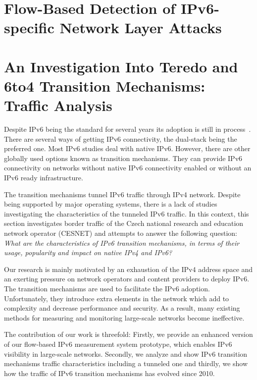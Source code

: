 \section{Flow-Based Detection of IPv6-specific Network Layer Attacks}\label{sec:analysis-ipv6-attacks}

\section{An Investigation Into Teredo and 6to4 Transition Mechanisms: Traffic Analysis}\label{sec:analysis-ipv6-transition}

Despite IPv6 being the standard for several years its adoption is still in process~\cite{Claffy-2011-Tracking}. There are several ways of getting IPv6 connectivity, the dual-stack being the preferred one. Most IPv6 studies deal with native IPv6. However, there are other globally used options known as transition mechanisms. They can provide IPv6 connectivity on networks without native IPv6 connectivity enabled or without an IPv6 ready infrastructure.

The transition mechanisms tunnel IPv6 traffic through IPv4 network. Despite being supported by major operating systems, there is a lack of studies investigating the characteristics of the tunneled IPv6 traffic. In this context, this section investigates border traffic of the Czech national research and education network operator (CESNET) and attempts to answer the following question: \emph{What are the characteristics of IPv6 transition mechanisms, in terms of their usage, popularity and impact on native IPv4 and IPv6?}

Our research is mainly motivated by an exhaustion of the IPv4 address space and an exerting pressure on network operators and content providers to deploy IPv6. The transition mechanisms are used to facilitate the IPv6 adoption. Unfortunately, they introduce extra elements in the network which add to complexity and decrease performance and security. As a result, many existing methods for measuring and monitoring large-scale networks become ineffective.

The contribution of our work is threefold: Firstly, we provide an enhanced version of our flow-based IPv6 measurement system prototype, which enables IPv6 visibility in large-scale networks. Secondly, we analyze and show IPv6 transition mechanisms traffic characteristics including a tunneled one and thirdly, we show how the traffic of IPv6 transition mechanisms has evolved since 2010.

